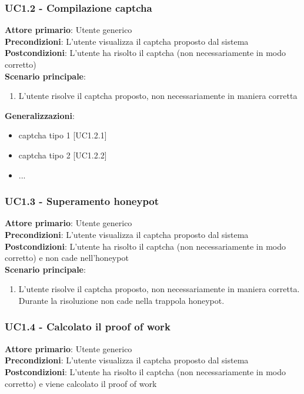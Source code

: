 \subsubsection{UC1.2 - Compilazione captcha}
\textbf{Attore primario}: Utente generico\\
\textbf{Precondizioni}: L'utente visualizza il captcha proposto dal sistema\\
\textbf{Postcondizioni}: L'utente ha risolto il captcha (non necessariamente in modo corretto)\\

\textbf{Scenario principale}:
\begin{enumerate}
   \item L'utente risolve il captcha proposto, non necessariamente in maniera corretta
\end{enumerate}
\textbf{Generalizzazioni}:
\begin{itemize}
   \item captcha tipo 1 [UC1.2.1]
   \item captcha tipo 2 [UC1.2.2]
   \item ...
\end{itemize}

\subsubsection{UC1.3 - Superamento honeypot}
\textbf{Attore primario}: Utente generico\\
\textbf{Precondizioni}: L'utente visualizza il captcha proposto dal sistema\\
\textbf{Postcondizioni}: L'utente ha risolto il captcha (non necessariamente in modo corretto) e non cade nell'honeypot\\

\textbf{Scenario principale}:
\begin{enumerate}
   \item L'utente risolve il captcha proposto, non necessariamente in maniera corretta. Durante la risoluzione non cade nella trappola honeypot.
\end{enumerate}

\subsubsection{UC1.4 - Calcolato il proof of work}
\textbf{Attore primario}: Utente generico\\
\textbf{Precondizioni}: L'utente visualizza il captcha proposto dal sistema\\
\textbf{Postcondizioni}: L'utente ha risolto il captcha (non necessariamente in modo corretto) e viene calcolato il proof of work\\

